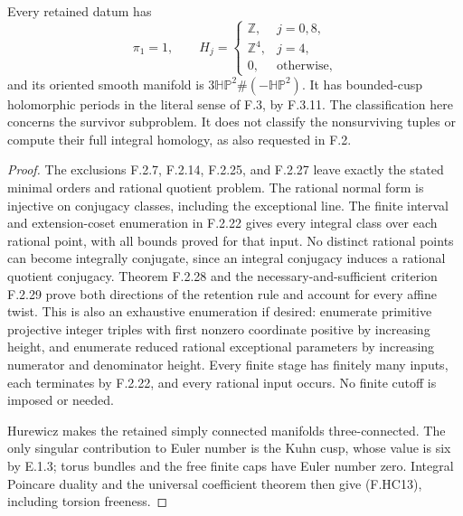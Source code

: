Every retained datum has
\[
 \pi_1=1,\qquad
 H_j=\begin{cases}
  \mathbb Z,&j=0,8,\\
  \mathbb Z^4,&j=4,\\
  0,&\text{otherwise},
 \end{cases}
 \tag{F.HC13}
\]
and its oriented smooth manifold is
$3\mathbb{HP}^2\#(-\mathbb{HP}^2)$.
It has bounded-cusp holomorphic periods in the literal
sense of F.3, by F.3.11.
The classification here concerns the survivor subproblem.
It does not classify the nonsurviving tuples or compute
their full integral homology, as also requested in F.2.

\begin{proof}
The exclusions F.2.7, F.2.14, F.2.25, and F.2.27
leave exactly the stated minimal orders and rational
quotient problem.
The rational normal form is injective on conjugacy
classes, including the exceptional line.
The finite interval and extension-coset enumeration
in F.2.22 gives every integral class over each rational
point, with all bounds proved for that input.
No distinct rational points can become integrally
conjugate, since an integral conjugacy induces a
rational quotient conjugacy.
Theorem F.2.28 and the necessary-and-sufficient
criterion F.2.29 prove both directions of the
retention rule and account for every affine twist.
This is also an exhaustive enumeration if desired:
enumerate primitive projective integer triples with
first nonzero coordinate positive by increasing height,
and enumerate reduced rational exceptional parameters
by increasing numerator and denominator height.
Every finite stage has finitely many inputs, each
terminates by F.2.22, and every rational input occurs.
No finite cutoff is imposed or needed.

Hurewicz makes the retained simply connected manifolds
three-connected.  The only singular contribution to
Euler number is the Kuhn cusp, whose value is six
by E.1.3; torus bundles and the free finite caps have
Euler number zero.
Integral Poincare duality and the universal coefficient
theorem then give (F.HC13), including torsion freeness.


\end{proof}
